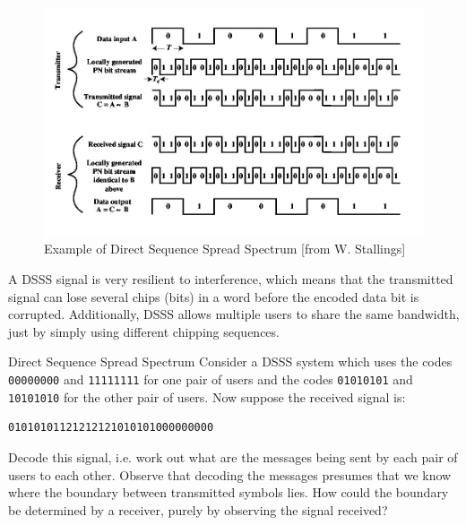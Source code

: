\begin{figure}
\begin{center}
\includegraphics[width=15 cm]{DSSS.jpg}
\caption{Example of Direct Sequence Spread Spectrum [from W. Stallings]}\label{DSSS}
\end{center}
\end{figure}

A DSSS signal is very resilient to interference, which means that the transmitted signal can 
lose several chips (bits) in a word before the encoded data bit is corrupted. Additionally, DSSS allows
multiple users to share the same bandwidth, just by simply using different chipping sequences. 


\begin{exercise}{Direct Sequence Spread Spectrum}
Consider a DSSS system which uses the codes \verb|00000000| and \verb|11111111| for
one pair of users and the codes \verb|01010101| and \verb|10101010| for the other pair of users.
Now suppose the received signal is:
\begin{verbatim}
01010101121212121010101000000000
\end{verbatim}
Decode this signal, i.e. work out what are the messages being sent by each pair of users
to each other. Observe that decoding the messages presumes that we know where the
boundary between transmitted symbols lies. How could the boundary be determined
by a receiver, purely by observing the signal received?
\end{exercise}


